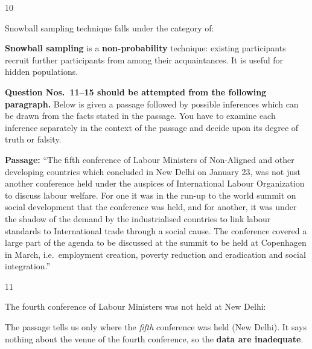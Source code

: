 \begin{question}{10}
{Snowball sampling technique falls under the category of:\par}
\begin{explain}
\textbf{Snowball sampling} is a \textbf{non-probability} technique: existing participants recruit further participants from among their acquaintances. It is useful for hidden populations.
\end{explain}
\end{question}

\begin{context}
\textbf{Question Nos.~11--15 should be attempted from the following paragraph.} Below is given a passage followed by possible inferences which can be drawn from the facts stated in the passage. You have to examine each inference separately in the context of the passage and decide upon its degree of truth or falsity.\par\smallskip
\textbf{Passage:} ``The fifth conference of Labour Ministers of Non-Aligned and other developing countries which concluded in New Delhi on January 23, was not just another conference held under the auspices of International Labour Organization to discuss labour welfare. For one it was in the run-up to the world summit on social development that the conference was held, and for another, it was under the shadow of the demand by the industrialised countries to link labour standards to International trade through a social cause. The conference covered a large part of the agenda to be discussed at the summit to be held at Copenhagen in March, i.e.\ employment creation, poverty reduction and eradication and social integration.''
\end{context}
\begin{question}{11}
{The fourth conference of Labour Ministers was not held at New Delhi:\par}
\begin{explain}
The passage tells us only where the \emph{fifth} conference was held (New Delhi). It says nothing about the venue of the fourth conference, so the \textbf{data are inadequate}.
\end{explain}
\end{question}

